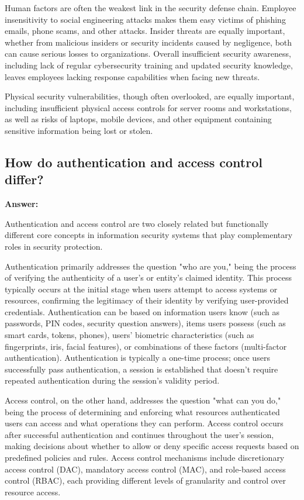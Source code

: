 \documentclass[12pt,a4paper]{article}
\begin{document}
Human factors are often the weakest link in the security defense chain. Employee insensitivity to social engineering attacks makes them easy victims of phishing emails, phone scams, and other attacks. Insider threats are equally important, whether from malicious insiders or security incidents caused by negligence, both can cause serious losses to organizations. Overall insufficient security awareness, including lack of regular cybersecurity training and updated security knowledge, leaves employees lacking response capabilities when facing new threats.

Physical security vulnerabilities, though often overlooked, are equally important, including insufficient physical access controls for server rooms and workstations, as well as risks of laptops, mobile devices, and other equipment containing sensitive information being lost or stolen.

\subsection{How do authentication and access control differ?}

\textbf{Answer:}

Authentication and access control are two closely related but functionally different core concepts in information security systems that play complementary roles in security protection.

Authentication primarily addresses the question "who are you," being the process of verifying the authenticity of a user's or entity's claimed identity. This process typically occurs at the initial stage when users attempt to access systems or resources, confirming the legitimacy of their identity by verifying user-provided credentials. Authentication can be based on information users know (such as passwords, PIN codes, security question answers), items users possess (such as smart cards, tokens, phones), users' biometric characteristics (such as fingerprints, iris, facial features), or combinations of these factors (multi-factor authentication). Authentication is typically a one-time process; once users successfully pass authentication, a session is established that doesn't require repeated authentication during the session's validity period.

Access control, on the other hand, addresses the question "what can you do," being the process of determining and enforcing what resources authenticated users can access and what operations they can perform. Access control occurs after successful authentication and continues throughout the user's session, making decisions about whether to allow or deny specific access requests based on predefined policies and rules. Access control mechanisms include discretionary access control (DAC), mandatory access control (MAC), and role-based access control (RBAC), each providing different levels of granularity and control over resource access.
\end{document}

